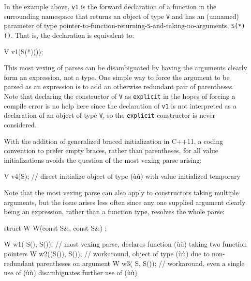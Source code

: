 \noindent In the example above, \lstinline!v1! is the forward declaration of a
function in the surrounding namespace that returns an object of type
\lstinline!V! and has an (unnamed) parameter of type
pointer-to-function-returning-\lstinline!S!-and-taking-no-arguments,
\lstinline!S(*)()!. That is, the declaration is equivalent to:

\begin{emcppslisting}[emcppsbatch=e17]
V v1(S(*)());
\end{emcppslisting}
    

\noindent This most vexing of parses can be disambiguated by having the arguments
clearly form an expression, not a type. One simple way to force the
argument to be parsed as an expression is to add an otherwise redundant
pair of parentheses. Note that declaring the constructor of \lstinline!V!
as \lstinline!explicit! in the hopes of forcing a compile error is no help
here since the declaration of \lstinline!v1! is not interpreted as a
declaration of an object of type \lstinline!V!, so the \lstinline!explicit!
constructor is never considered.

With the addition of generalized braced initialization in C++11, a
coding convention to prefer empty braces, rather than parentheses, for
all value initializations avoids the question of the most vexing parse
arising:

\begin{emcppslisting}[emcppsbatch=e17]
V v4(S{});  // direct initialize object of type (ù{}ù) with value initialized temporary
\end{emcppslisting}
    

\noindent Note that the most vexing parse can also apply to constructors taking
multiple arguments, but the issue arises less often since any one
supplied argument clearly being an expression, rather than a function
type, resolves the whole parse:

\begin{emcppslisting}[emcppsbatch=e17]
struct W { W(const S&, const S&) { } };

W w1( S(),  S());  // most vexing parse, declares function (ù{}ù) taking two function pointers
W w2((S()), S());  // workaround, object of type (ù{}ù) due to non-redundant parentheses on argument
W w3( S{},  S());  // workaround, even a single use of (ù{}ù) disambiguates further use of (ù{}ù)
\end{emcppslisting}
    

